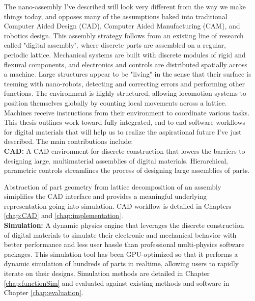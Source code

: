 {The nano-assembly I've described will look very different from the way we make things today, and opposes many of the assumptions baked into traditional Computer Aided Design (CAD),  Computer Aided Manufacturing (CAM), and robotics design.  This assembly strategy follows from an existing line of research called "digital assembly", where discrete parts are assembled on a regular, periodic lattice.  Mechanical systems are built with discrete modules of rigid and flexural components, and electronics and controls are distributed spatially across a machine.  Large structures appear to be "living" in the sense that their surface is teeming with nano-robots, detecting and correcting errors and performing other functions.  The environment is highly structured, allowing locomotion systems to position themselves globally by counting local movements across a lattice.  Machines receive instructions from their environment to coordinate various tasks.
\\

This thesis outlines work toward fully integrated, end-to-end software workflows for digital materials that will help us to realize the aspirational future I've just described.  The main contributions include:\\

\textbf{CAD:} A CAD environment for discrete construction that lowers the barriers to designing large, multimaterial assemblies of digital materials.  Hierarchical, parametric controls streamlines the process of designing large assemblies of parts.   

Abstraction of part geometry from lattice decomposition of an assembly simiplifies the CAD interface and provides a meaningful underlying representation going into simulation.  CAD workflow is detailed in Chapters \ref{chap:CAD} and \ref{chap:implementation}.\\

\textbf{Simulation:} A dynamic physics engine that leverages the discrete construction of digital materials to simulate their electronic and mechanical behavior with better performance and less user hassle than professional multi-physics software packages.  This simulation tool has been GPU-optimized so that it performs a dynamic simulation of hundreds of parts in realtime, allowing users to rapidly iterate on their designs.  Simulation methods are detailed in Chapter \ref{chap:functionSim} and evaluated against existing methods and software in Chapter \ref{chap:evaluation}.\\

}

